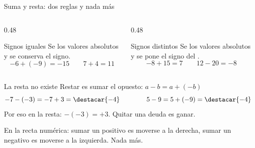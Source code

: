\documentclass[aspectratio=169,10pt]{beamer}
\begin{document}
\begin{frame}{Suma y resta: dos reglas y nada más}
  \scriptsize
  \begin{columns}[T,onlytextwidth]
    \begin{column}{0.48\textwidth}
      \begin{block}{Signos iguales}
        \scriptsize
        Se  los valores absolutos y se conserva el signo.
        \[ -6 + (-9) = -15 \qquad 7 + 4 = 11 \]
      \end{block}
    \end{column}
    \begin{column}{0.48\textwidth}
      \begin{block}{Signos distintos}
        \scriptsize
        Se  los valores absolutos y se pone el signo del
        .
        \[ -8 + 15 = 7 \qquad 12 - 20 = -8 \]
      \end{block}
    \end{column}
  \end{columns}

  \vspace{0.15cm}
  \begin{exampleblock}{La resta no existe}
    \scriptsize
    Restar es sumar el opuesto: \quad $a - b = a + (-b)$
    \[ -7 - (-3) = -7 + 3 = \destacar{-4} \qquad\qquad
       5 - 9 = 5 + (-9) = \destacar{-4} \]
    Por eso  en la resta: $-(-3) = +3$. Quitar una
    deuda es ganar.
  \end{exampleblock}

  \vspace{0.05cm}
  {\tiny\color{uniGris} En la recta numérica: sumar un positivo es moverse a la
  derecha, sumar un negativo es moverse a la izquierda. Nada más.}
\end{frame}
\end{document}
